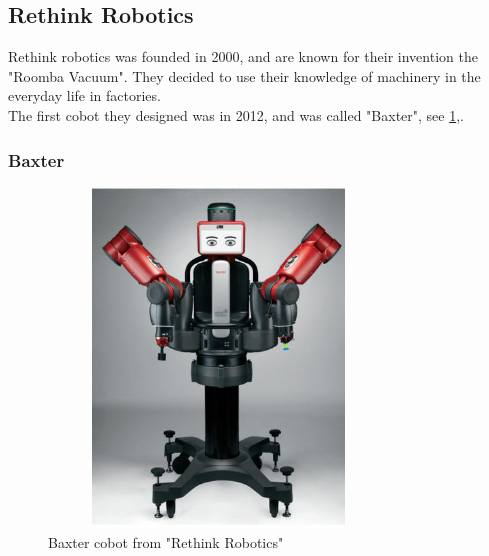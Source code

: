\subsection{Rethink Robotics}

Rethink robotics was founded in 2000, and are known for their invention the "Roomba Vacuum". They decided to use their knowledge of machinery in the everyday life in factories.\\
The first cobot they designed was in 2012, and was called "Baxter", see \ref{fig:Rethink},\cite{Rethink}.

\subsubsection{Baxter}
\begin{figure}[H]
    \centering
    \includegraphics[width=9cm, height=9cm]{UR/baxter-robot-1.jpg}
    \caption{Baxter cobot from "Rethink Robotics"\cite{Rethinkbillede}}
    \label{fig:Rethink}
\end{figure}

